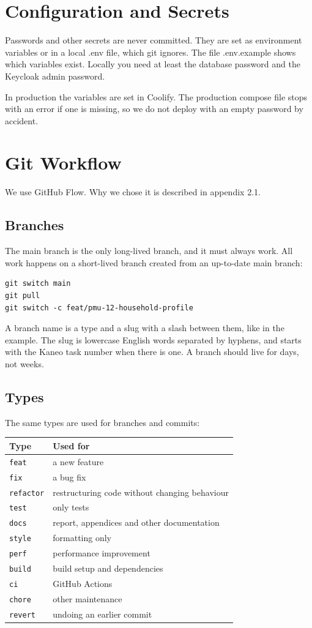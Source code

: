 \documentclass[a4paper,11pt]{article}
\begin{document}
\section{Configuration and Secrets}
Passwords and other secrets are never committed. They are set as environment variables or in a local .env file, which git ignores. The file .env.example shows which variables exist. Locally you need at least the database password and the Keycloak admin password.

In production the variables are set in Coolify. The production compose file stops with an error if one is missing, so we do not deploy with an empty password by accident.

\section{Git Workflow}
We use GitHub Flow. Why we chose it is described in appendix 2.1.

\subsection{Branches}
The main branch is the only long-lived branch, and it must always work. All work happens on a short-lived branch created from an up-to-date main branch:
\begin{lstlisting}
git switch main
git pull
git switch -c feat/pmu-12-household-profile
\end{lstlisting}

A branch name is a type and a slug with a slash between them, like in the example. The slug is lowercase English words separated by hyphens, and starts with the Kaneo task number when there is one. A branch should live for days, not weeks.

\subsection{Types}
The same types are used for branches and commits:

\begin{center}
\begin{tabular}{@{}l l@{}}
\textbf{Type} & \textbf{Used for} \\
\hline
\texttt{feat} & a new feature \\
\texttt{fix} & a bug fix \\
\texttt{refactor} & restructuring code without changing behaviour \\
\texttt{test} & only tests \\
\texttt{docs} & report, appendices and other documentation \\
\texttt{style} & formatting only \\
\texttt{perf} & performance improvement \\
\texttt{build} & build setup and dependencies \\
\texttt{ci} & GitHub Actions \\
\texttt{chore} & other maintenance \\
\texttt{revert} & undoing an earlier commit \\
\end{tabular}
\end{center}
\end{document}
